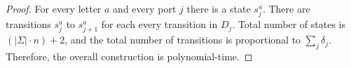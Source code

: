 \begin{proof}
    For every letter $a$ and every port $j$ there is a state $s^a_j$. There are transitions $s^a_j$ to $s^a_{j+1}$ for each every transition in $D_j$. Total number of states is $(|\Sigma| \cdot n) + 2$, and the total number of transitions is proportional to $\sum_j \delta_j$.  Therefore, the overall construction is polynomial-time.


\end{proof}